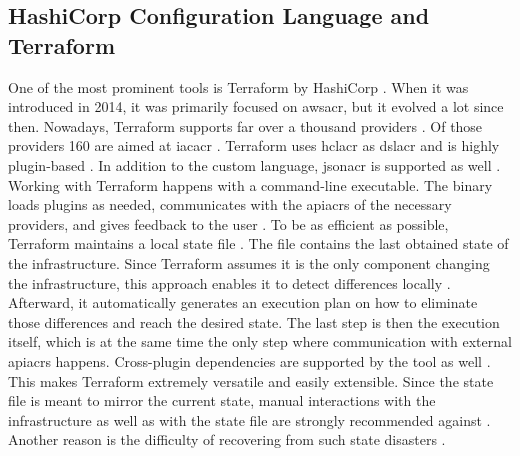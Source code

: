 \subsection{HashiCorp Configuration Language and Terraform}
One of the most prominent tools is Terraform by HashiCorp \cite{googletrends_iac}. When it was introduced in 2014, it was primarily focused on \gls{awsacr}, but it evolved a lot since then. Nowadays, Terraform supports far over a thousand providers \cite{terraform_providers}. Of those providers  160 are aimed at \gls{iacacr} \cite{terraform_providers_infrastructure}. Terraform uses \gls{hclacr} as \gls{dslacr} and is highly plugin-based \cite{terraform} \cite{terraform_docs_extend}. In addition to the custom language, \gls{jsonacr} is supported as well \cite{terraform_syntax}.
\newline
Working with Terraform happens with a command-line executable. The binary loads plugins as needed, communicates with the \gls{apiacr}s of the necessary providers, and gives feedback to the user \cite{terraform_plugins}. To be as efficient as possible, Terraform maintains a local state file \cite{terraform_state}. The file contains the last obtained state of the infrastructure. Since Terraform assumes it is the only component changing the infrastructure, this approach enables it to detect differences locally \cite{terraform_state_purpose}. Afterward, it automatically generates an execution plan on how to eliminate those differences and reach the desired state. The last step is then the execution itself, which is at the same time the only step where communication with external \gls{apiacr}s happens.
\newline
Cross-plugin dependencies are supported by the tool as well \cite{terraform_how_it_works_with_plugins}. This makes Terraform extremely versatile and easily extensible.
\newline
Since the state file is meant to mirror the current state, manual interactions with the infrastructure as well as with the state file are strongly recommended against \cite{terraform_cli_recover}. Another reason is the difficulty of recovering from such state disasters \cite{terraform_cli_recover}.

